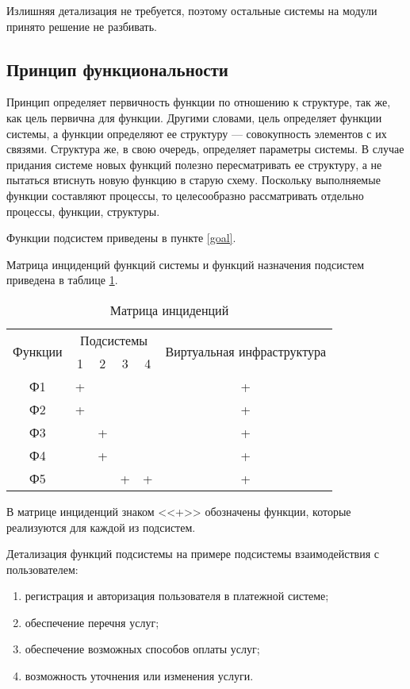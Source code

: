 Излишняя детализация не требуется, поэтому остальные системы на модули принято решение не разбивать.

\subsection{Принцип функциональности}

Принцип определяет первичность функции по отношению к структуре, так же, как цель первична для функции.
Другими словами, цель определяет функции системы, а функции определяют ее структуру --- совокупность элементов с их связями.
Структура же, в свою очередь, определяет параметры системы.
В случае придания системе новых функций полезно пересматривать ее структуру, а не пытаться втиснуть новую функцию в старую схему.
Поскольку выполняемые функции составляют процессы, то целесообразно рассматривать отдельно процессы, функции, структуры.

Функции подсистем приведены в пункте \ref{goal}.

Матрица инциденций функций системы и функций назначения подсистем приведена в таблице \ref{inc-matrix}.
\begin{table}[H]
  \caption{Матрица инциденций}\label{inc-matrix}
  \begin{tabular}{|c|c|c|c|c|c|}
  \hline \multirow{2}{*}{Функции} & \multicolumn{4}{|c|}{Подсистемы} & \multirow{2}{*}{Виртуальная инфраструктура} \\
  \cline{2-5} & 1 & 2 & 3 & 4 & \\
  \hline Ф1 & + & & & & + \\
  \hline Ф2 & + & & & & + \\
  \hline Ф3 & & + & & & + \\
  \hline Ф4 & & + & & & + \\
  \hline Ф5 & & & + & + & + \\
  \hline
  \end{tabular}
\end{table}

В матрице инциденций знаком <<+>> обозначены функции, которые реализуются для каждой из подсистем.

Детализация функций подсистемы на примере подсистемы взаимодействия с пользователем:
\begin{enumerate}
  \item регистрация и авторизация пользователя в платежной системе;
  \item обеспечение перечня услуг;
  \item обеспечение возможных способов оплаты услуг;
  \item возможность уточнения или изменения услуги.
\end{enumerate}

